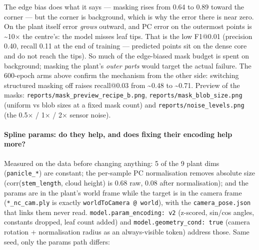 \documentclass[
  10pt,
]{article}
\begin{document}
The edge bias does what it says --- masking rises from 0.64 to 0.89
toward the corner --- but the corner is background, which is why the
error there is near zero. On the plant itself error \emph{grows}
outward, and PC error on the outermost points is \textasciitilde10× the
centre's: the model misses leaf tips. That is the low F1@0.01 (precision
0.40, recall 0.11 at the end of training --- predicted points sit on the
dense core and do not reach the tips). So much of the edge-biased mask
budget is spent on background; masking the plant's \emph{outer parts}
would target the actual failure. The 600-epoch arms above confirm the
mechanism from the other side: switching structured masking off raises
recall@0.03 from \textasciitilde0.48 to \textasciitilde0.71. Preview of
the masks: \texttt{reports/mask\_preview\_recipe\_b.png},
\texttt{reports/mask\_blob\_size.png} (uniform vs blob sizes at a fixed
mask count) and \texttt{reports/noise\_levels.png} (the 0.5× / 1× / 2×
sensor noise).

\paragraph{Spline params: do they help, and does fixing their encoding
help
more?}\label{spline-params-do-they-help-and-does-fixing-their-encoding-help-more}

Measured on the data before changing anything: 5 of the 9 plant dims
(\texttt{panicle\_*}) are constant; the per-sample PC normalisation
removes absolute size (corr(\texttt{stem\_length}, cloud height) is 0.68
raw, 0.08 after normalisation); and the params are in the plant's world
frame while the target is in the camera frame (\texttt{*\_nc\_cam.ply}
is exactly \texttt{worldToCamera\ @\ world}), with the
\texttt{camera\_pose.json} that links them never read.
\texttt{model.param\_encoding:\ v2} (z-scored, sin/cos angles, constants
dropped, leaf count added) and \texttt{model.geometry\_cond:\ true}
(camera rotation + normalisation radius as an always-visible token)
address those. Same seed, only the params path differs:
\end{document}
